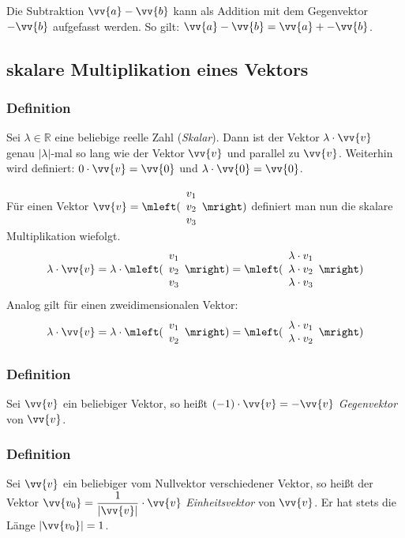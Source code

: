 \documentclass[a4paper,12pt]{article}
\newcommand{\R}{\mathbb{R}}
\begin{document}
Die Subtraktion $\vv{a}-\vv{b}$ kann als Addition mit dem Gegenvektor $-\vv{b}$ aufgefasst werden. So gilt: $\vv{a}-\vv{b} = \vv{a}+ -\vv{b}$.

\subsection{skalare Multiplikation eines Vektors}
\subsubsection{Definition}
Sei $\lambda\in\R$ eine beliebige reelle Zahl (\emph{Skalar}). Dann ist der Vektor $\lambda \cdot \vv{v}$ genau $|\lambda|$-mal so lang wie der Vektor $\vv{v}$ und parallel zu $\vv{v}$. Weiterhin wird definiert: $0 \cdot \vv{v}=\vv{0}$ und $\lambda \cdot \vv{0} = \vv{0}$. \par
Für einen Vektor $\vv{v}=\mleft( \begin{array}{c} v_1 \\ v_2 \\ v_3  \end{array} \mright)$ definiert man nun die skalare Multiplikation wiefolgt. 
\[ \lambda \cdot \vv{v} = \lambda \cdot \mleft( \begin{array}{c} v_1 \\ v_2 \\ v_3  \end{array} \mright) = \mleft( \begin{array}{c} \lambda \cdot v_1 \\ \lambda \cdot v_2 \\ \lambda \cdot v_3  \end{array} \mright) \]
Analog gilt für einen zweidimensionalen Vektor: 
\[ \lambda \cdot \vv{v} = \lambda \cdot \mleft( \begin{array}{c} v_1 \\ v_2  \end{array} \mright) = \mleft( \begin{array}{c} \lambda \cdot v_1 \\ \lambda \cdot v_2 \end{array} \mright) \]

\subsubsection{Definition}
Sei $\vv{v}$ ein beliebiger Vektor, so heißt $(-1) \cdot \vv{v} = -\vv{v}$ \emph{Gegenvektor} von $\vv{v}$. 

\subsubsection{Definition}
Sei $\vv{v}$ ein beliebiger vom Nullvektor verschiedener Vektor, so heißt der Vektor $\vv{v_0}= \dfrac{1}{|\vv{v}|}\cdot \vv{v}$ \emph{Einheitsvektor} von $\vv{v}$. Er hat stets die Länge $|\vv{v_0}|=1$.
\end{document}
